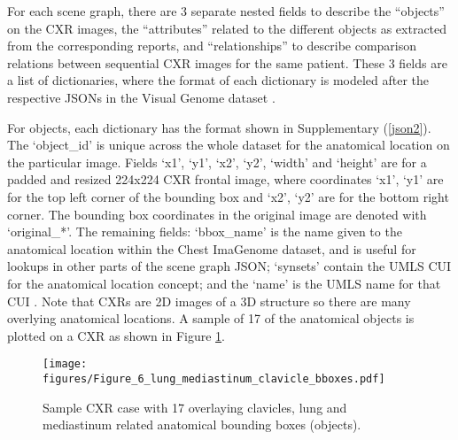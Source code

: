 
For each scene graph, there are 3 separate nested fields to describe the ``objects'' on the CXR images, the ``attributes'' related to the different objects as extracted from the corresponding reports, and ``relationships'' to describe comparison relations between sequential CXR images for the same patient. These 3 fields are a list of dictionaries, where the format of each dictionary is modeled after the respective JSONs in the Visual Genome dataset \cite{krishna2017visual}.

For objects, each dictionary has the format shown in Supplementary (\ref{json2}). The `object\_id' is unique across the whole dataset for the anatomical location on the particular image. Fields `x1', `y1', `x2', `y2', `width' and `height' are for a padded and resized 224x224 CXR frontal image, where coordinates `x1', `y1' are for the top left corner of the bounding box and `x2', `y2' are for the bottom right corner. The bounding box coordinates in the original image are denoted with `original\_*'. The remaining fields: `bbox\_name' is the name given to the anatomical location within the Chest ImaGenome dataset, and is useful for lookups in other parts of the scene graph JSON; `synsets' contain the UMLS CUI for the anatomical location concept; and the `name' is the UMLS name for that CUI \cite{bodenreider2004unified}. Note that CXRs are 2D images of a 3D structure so there are many overlying anatomical locations. A sample of 17 of the anatomical objects is plotted on a CXR as shown in Figure \ref{fig:bbox-sample}.
\vspace{-5pt}

\begin{figure}[!ht]
\centering
\texttt{[image: figures/Figure\_6\_lung\_mediastinum\_clavicle\_bboxes.pdf]}
\caption{Sample CXR case with 17 overlaying clavicles, lung and mediastinum related anatomical bounding boxes (objects).}
\label{fig:bbox-sample}
\vspace{-12pt}
\end{figure}

